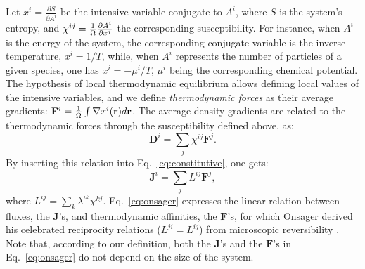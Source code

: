 Let $x^i=\frac{\partial S}{\partial A^i}$ be the intensive variable conjugate to $A^i$, where $S$ is the system's entropy, and $\chi^{ij} = \frac{1}{{\mathrm\Omega}} \frac{\partial A^i}{\partial x^j}$ the corresponding susceptibility. For instance, when $A^i$ is the energy of the system, the corresponding conjugate variable is the inverse temperature, $x^i=1/T$, while, when $A^i$ represents the number of particles of a given species, one has $x^i= - \mu^i/T$, $\mu^i$ being the corresponding chemical potential. The hypothesis of local thermodynamic equilibrium allows defining local values of the intensive variables, and we define \emph{thermodynamic forces} as their average gradients: $\mathbf{F}^i= \frac{1}{{\mathrm\Omega}} \int \nabla x^i(\mathbf{r})d\mathbf{r}$. The average density gradients are related to the thermodynamic forces through the susceptibility defined above, as:
\begin{equation}
\mathbf{D}^i=\sum_j\chi^{ij}\mathbf{F}^j .
\end{equation}
By inserting this relation into Eq.~\eqref{eq:constitutive}, one gets:
\begin{equation}
\mathbf{J}^i=\sum_j L^{ij} \mathbf{F}^j, \label{eq:onsager}
\end{equation}
where $L^{ij}=\sum_k\lambda^{ik}\chi^{kj}$. Eq.~\eqref{eq:onsager} expresses the linear relation between fluxes, the $\mathbf{J}$'s, and thermodynamic affinities, the $\mathbf{F}$'s, for which Onsager derived his celebrated reciprocity relations ($L^{ji}=L^{ij}$) from microscopic reversibility \cite{Onsager1931a,Onsager1931b,Casimir1945}. Note that, according to our definition, both the $\mathbf{J}$'s and the $\mathbf{F}$'s in Eq.~\eqref{eq:onsager} do not depend on the size of the system.


